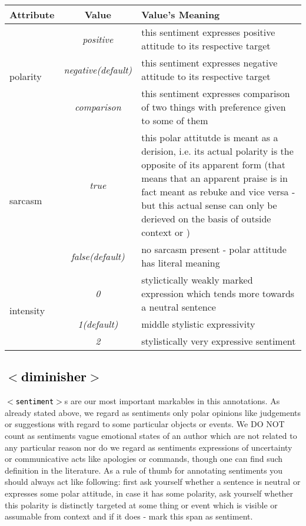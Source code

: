 \documentclass[11pt,a4paper]{article}
\newcommand{\xmltag}[1]{\textcolor{black}{{\small$<$#1$>$}}}
\begin{document}
\begin{tabular}{|l|c|p{}|}\hline
  Attribute & Value & Value's Meaning\\\hline

  \multirow{3}{*}{polarity} & \textit{positive} & this sentiment
  expresses positive attitude to its respective target\\\cline{2-3}

  & \textit{negative\newline(default)} & this sentiment
  expresses negative attitude to its respective target\\\cline{2-3}

  & \textit{comparison} & this sentiment expresses comparison of two
  things with preference given to some of them\\\hline


  \multirow{2}{*}{sarcasm} & \textit{true} & this polar attitutde is
  meant as a derision, i.e. its actual polarity is the opposite of its
  apparent form (that means that an apparent praise is in fact meant
  as rebuke and vice versa - but this actual sense can only be
  derieved on the basis of outside context or )\\\cline{2-3}

  & \textit{false\newline(default)} & no sarcasm present - polar
  attitude has literal meaning\\\hline

  \multirow{3}{*}{intensity} & \textit{0} & stylictically weakly
  marked expression which tends more towards a neutral
  sentence\\\cline{2-3}

  & \textit{1\newline(default)} & middle stylistic
  expressivity\\\cline{2-3}

  & \textit{2} & stylistically very expressive sentiment\\\hline
\end{tabular}

\subsection{\xmltag{diminisher}}
\texttt{\xmltag{sentiment}}s are our most important markables in this
annotations. As already stated above, we regard as sentiments only
polar opinions like judgements or suggestions with regard to some
particular objects or events. We DO NOT count as sentiments vague
emotional states of an author which are not related to any particular
reason nor do we regard as sentiments expressions of uncertainty or
communicative acts like apologies or commands, though one can find
such definition in the literature. As a rule of thumb for annotating
sentiments you should always act like following: first ask yourself
whether a sentence is neutral or expresses some polar attitude, in
case it has some polarity, ask yourself whether this polarity is
distinctly targeted at some thing or event which is visible or
assumable from context and if it does - mark this span as sentiment.
\end{document}

